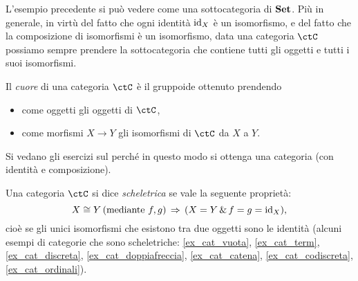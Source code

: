 L'esempio precedente si può vedere come una sottocategoria di \(\mathbf{Set}\).
Più in generale, in virtù del fatto che ogni identità \(\mathrm{id}_X\) è un isomorfismo, e del fatto che la composizione di isomorfismi è un isomorfismo, data una categoria \(\ctC\) possiamo sempre prendere la sottocategoria che contiene tutti gli oggetti e tutti i suoi isomorfismi.
\begin{definition}\label{def_cuore}
	Il \emph{cuore} di una categoria \(\ctC\) è il gruppoide ottenuto prendendo
	\begin{itemize}
		\item come oggetti gli oggetti di \(\ctC\),
		\item come morfismi \(X\to Y\) gli isomorfismi di \(\ctC\) da \(X\) a \(Y\).
	\end{itemize}
\end{definition}

Si vedano gli esercizi sul perché in questo modo si ottenga una categoria (con identità e composizione).

\begin{definition}\label{def_cat_scheletrica}
	Una categoria \(\ctC\) si dice \emph{scheletrica} se vale la seguente proprietà:
	\[X\cong Y \, (\text{mediante } f,g) \,\Rightarrow\, (X=Y \,\&\, f=g=\mathrm{id}_X),\]
	cioè se gli unici isomorfismi che esistono tra due oggetti sono le identità (alcuni esempi di categorie che sono scheletriche: \ref{ex_cat_vuota}, \ref{ex_cat_term}, \ref{ex_cat_discreta}, \ref{ex_cat_doppiafreccia}, \ref{ex_cat_catena}, \ref{ex_cat_codiscreta}, \ref{ex_cat_ordinali}).
\end{definition}
